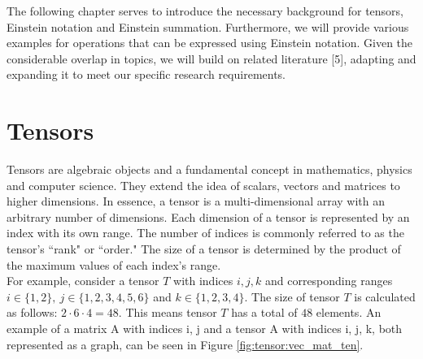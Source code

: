 The following chapter serves to introduce the necessary background for tensors,
Einstein notation and Einstein summation. Furthermore, we will provide various
examples for operations that can be expressed using Einstein notation. Given the
considerable overlap in topics, we will build on related literature [5], adapting
and expanding it to meet our specific research requirements.

\section{Tensors}
Tensors are algebraic objects and a fundamental concept in mathematics, physics
and computer science. They extend the idea of scalars, vectors and matrices to
higher dimensions. In essence, a tensor is a multi-dimensional array with an arbitrary
number of dimensions. Each dimension of a tensor is represented by an index with its
own range. The number of indices is commonly referred to as the tensor's ``rank" or
``order." The size of a tensor is determined by the product of the maximum values of
each index's range.\\
For example, consider a tensor $T$ with indices $i,j,k$ and corresponding ranges
$i \in \{1,2\},\ j \in \{1,2,3,4,5,6\}$ and $k \in \{1,2,3,4\}$. The size of
tensor $T$ is calculated as follows: $2 \cdot 6 \cdot 4 = 48$. This means tensor
$T$ has a total of $48$ elements. An example of a matrix A with indices i, j and a tensor
A with indices i, j, k, both represented as a graph, can be seen in Figure
\ref{fig:tensor:vec_mat_ten}.

